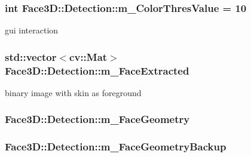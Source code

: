 \subsubsection[{\texorpdfstring{m\+\_\+\+Color\+Thres\+Value}{m_ColorThresValue}}]{\setlength{\rightskip}{0pt plus 5cm}int Face3\+D\+::\+Detection\+::m\+\_\+\+Color\+Thres\+Value = 10\hspace{0.3cm}{\ttfamily [private]}}\hypertarget{class_face3_d_1_1_detection_af355af4e433dcf85e4ebdfbd36ae8939}{}\label{class_face3_d_1_1_detection_af355af4e433dcf85e4ebdfbd36ae8939}
gui interaction 
\subsubsection[{\texorpdfstring{m\+\_\+\+Face\+Extracted}{m_FaceExtracted}}]{\setlength{\rightskip}{0pt plus 5cm}std\+::vector$<$cv\+::\+Mat$>$ Face3\+D\+::\+Detection\+::m\+\_\+\+Face\+Extracted\hspace{0.3cm}{\ttfamily [private]}}\hypertarget{class_face3_d_1_1_detection_a835e20dfe0fc3c9cee63168c4467dd82}{}\label{class_face3_d_1_1_detection_a835e20dfe0fc3c9cee63168c4467dd82}


binary image with skin as foreground 

\subsubsection[{\texorpdfstring{m\+\_\+\+Face\+Geometry}{m_FaceGeometry}}]{ Face3\+D\+::\+Detection\+::m\+\_\+\+Face\+Geometry\hspace{0.3cm}{\ttfamily [private]}}\hypertarget{class_face3_d_1_1_detection_a4eed1e18b8465d43d75102bf10ce8575}{}\label{class_face3_d_1_1_detection_a4eed1e18b8465d43d75102bf10ce8575}
\subsubsection[{\texorpdfstring{m\+\_\+\+Face\+Geometry\+Backup}{m_FaceGeometryBackup}}]{ Face3\+D\+::\+Detection\+::m\+\_\+\+Face\+Geometry\+Backup\hspace{0.3cm}{\ttfamily [private]}}\hypertarget{class_face3_d_1_1_detection_a45ddf526188a8eb73de53bc2029c66f6}{}\label{class_face3_d_1_1_detection_a45ddf526188a8eb73de53bc2029c66f6}


